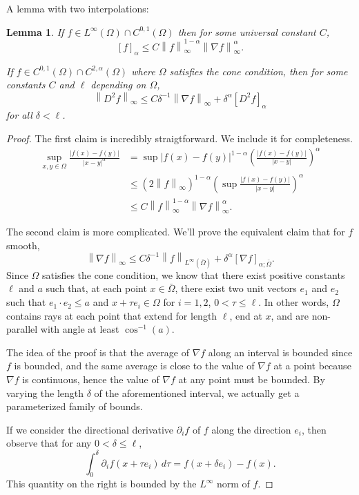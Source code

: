 \documentclass[11pt]{amsart}
\newtheorem{lemma}[theorem]{Lemma}
\theoremstyle{remark}
\newcommand{\norm}[1]{\left\lVert#1\right\rVert}
\newcommand{\paren}[1]{\left( #1 \right)}
\newcommand{\bracket}[1]{\left[ #1 \right]}
\newcommand{\del}{\partial}
\newcommand{\grad}{\nabla}
\newcommand{\n}{^{-1}}
\begin{document}
A lemma with two interpolations:
\begin{lemma}
If $f \in L^\infty(\Omega) \cap C^{0,1}(\Omega)$ then for some universal constant $C$,
\[ \bracket{f}_\alpha \leq C \norm{f}_\infty^{1-\alpha} \norm{\grad f}_\infty^\alpha. \]

If $f \in C^{0,1}(\Omega) \cap C^{2,\alpha}(\Omega)$ where $\Omega$ satisfies the cone condition, then for some constants $C$ and $\ell$ depending on $\Omega$,
\[ \norm{D^2 f}_\infty \leq C \delta\n \norm{\grad f}_\infty  + \delta^\alpha \bracket{D^2 f}_\alpha\]
for all $\delta < \ell$.  
\end{lemma}
\begin{proof}
The first claim is incredibly straigtforward.  We include it for completeness.  
\begin{align*} 
\sup_{x,y \in \Omega} \frac{|f(x)-f(y)|}{|x-y|^\alpha} &= \sup |f(x)-f(y)|^{1-\alpha} \paren{\frac{|f(x)-f(y)|}{|x-y|}}^\alpha 
\\ &\leq \paren{2 \norm{f}_\infty}^{1-\alpha} \paren{ \sup \frac{|f(x)-f(y)|}{|x-y|} }^\alpha
\\ &\leq C \norm{f}_\infty^{1-\alpha} \norm{\grad f}_\infty^\alpha.
\end{align*}

The second claim is more complicated.  We'll prove the equivalent claim that for $f$ smooth,
\[ \norm{\grad f}_\infty \leq C \delta\n \norm{f}_{L^\infty(\bar{\Omega})} + \delta^\alpha \bracket{\grad f}_{\alpha;\bar{\Omega}}.\]
Since $\Omega$ satisfies the cone condition, we know that there exist positive constants $\ell$ and $a$ such that, at each point $x \in \bar{\Omega}$, there exist two unit vectors $e_1$ and $e_2$ such that $e_1\cdot e_2 \leq a$ and $x + \tau e_i \in \Omega$ for $i=1,2$, $0 < \tau \leq \ell$.  In other words, $\Omega$ contains rays at each point that extend for length $\ell$, end at $x$, and are non-parallel with angle at least $\cos\n(a)$.  

The idea of the proof is that the average of $\grad f$ along an interval is bounded since $f$ is bounded, and the same average is close to the value of $\grad f$ at a point because $\grad f$ is continuous, hence the value of $\grad f$ at any point must be bounded.  By varying the length $\delta$ of the aforementioned interval, we actually get a parameterized family of bounds.  

If we consider the directional derivative $\del_i f$ of $f$ along the direction $e_i$, then observe that for any $0 < \delta \leq \ell$,
\[ \int_0^\delta \del_i f(x + \tau e_i) \,d\tau = f(x+\delta e_i) - f(x). \]
This quantity on the right is bounded by the $L^\infty$ norm of $f$.  


\end{proof}
\end{document}
